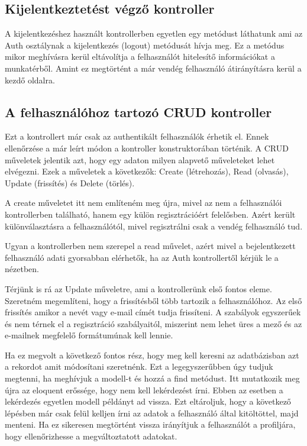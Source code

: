 \documentclass[
]{thesis-ekf}
\theoremstyle{definition}
\theoremstyle{remark}
\begin{document}
	\subsection{Kijelentkeztetést végző kontroller} 
	A kijelentkezéshez használt kontrollerben egyetlen egy metódust láthatunk ami az Auth osztálynak a kijelentkezés (logout) metódusát hívja meg. Ez a metódus mikor meghívásra kerül eltávolítja a felhasználót hitelesítő információkat a munkatérből. Amint ez megtörtént a már vendég felhasználó átirányításra kerül a kezdő oldalra.
	
	\subsection{A felhasználóhoz tartozó CRUD kontroller}
	Ezt a kontrollert már csak az authentikált felhasználók érhetik el. Ennek ellenőrzése a már leírt módon a kontroller konstruktorában történik. A CRUD műveletek jelentik azt, hogy egy adaton milyen alapvető műveleteket lehet elvégezni. Ezek a műveletek a következők: Create (létrehozás), Read (olvasás), Update (frissítés) és Delete (törlés). 
	
	A create műveletet itt nem említeném meg újra, mivel az nem a felhasználói kontrollerben található, hanem egy külön regisztrációért felelősben. Azért került különválasztásra a felhasználótól, mivel regisztrálni csak a vendég felhasználó tud. 
	
	Ugyan a kontrollerben nem szerepel a read művelet, azért mivel a bejelentkezett felhasználó adati gyorsabban elérhetők, ha az Auth kontrollertől kérjük le a nézetben.
	
	Térjünk is rá az Update műveletre, ami a kontrollerünk első fontos eleme. Szeretném megemlíteni, hogy a frissítésből több tartozik a felhasználóhoz. Az első frissítés amikor a nevét vagy e-mail címét tudja frissíteni. A szabályok egyszerűek és nem térnek el a regisztráció szabályaitól, miszerint nem lehet üres a mező és az e-mailnek megfelelő formátumúnak kell lennie.
	
	Ha ez megvolt a következő fontos rész, hogy meg kell keresni az adatbázisban azt a rekordot amit módosítani szeretnénk. Ezt a legegyszerűbben úgy tudjuk megtenni, ha meghívjuk a modell-t és hozzá a find metódust. Itt mutatkozik meg újra az eloquent erőssége, hogy nem kell lekérdezést írni. Ebben az esetben a lekérdezés egyetlen modell példányt ad vissza. Ezt eltároljuk, hogy a következő lépésben már csak felül kelljen írni az adatok a felhasználó által kitöltöttel, majd menteni. Ha ez sikeresen megtörtént vissza irányítjuk a felhasználót a profiljára, hogy ellenőrizhesse a megváltoztatott adatokat. 
	
\end{document}
